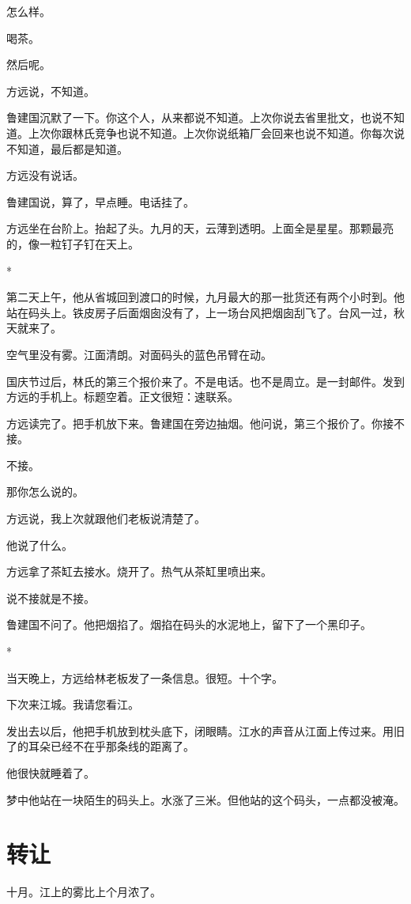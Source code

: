 \documentclass[UTF8,a5paper,11pt,openany]{ctexbook}
\newcommand{\scene}{\vspace{1em}\begin{center}*\quad*\quad*\end{center}\vspace{0.5em}}
\begin{document}
怎么样。

喝茶。

然后呢。

方远说，不知道。

鲁建国沉默了一下。你这个人，从来都说不知道。上次你说去省里批文，也说不知道。上次你跟林氏竞争也说不知道。上次你说纸箱厂会回来也说不知道。你每次说不知道，最后都是知道。

方远没有说话。

鲁建国说，算了，早点睡。电话挂了。

方远坐在台阶上。抬起了头。九月的天，云薄到透明。上面全是星星。那颗最亮的，像一粒钉子钉在天上。


\scene

第二天上午，他从省城回到渡口的时候，九月最大的那一批货还有两个小时到。他站在码头上。铁皮房子后面烟囱没有了，上一场台风把烟囱刮飞了。台风一过，秋天就来了。

空气里没有雾。江面清朗。对面码头的蓝色吊臂在动。

国庆节过后，林氏的第三个报价来了。不是电话。也不是周立。是一封邮件。发到方远的手机上。标题空着。正文很短：速联系。

方远读完了。把手机放下来。鲁建国在旁边抽烟。他问说，第三个报价了。你接不接。

不接。

那你怎么说的。

方远说，我上次就跟他们老板说清楚了。

他说了什么。

方远拿了茶缸去接水。烧开了。热气从茶缸里喷出来。

说不接就是不接。

鲁建国不问了。他把烟掐了。烟掐在码头的水泥地上，留下了一个黑印子。


\scene

当天晚上，方远给林老板发了一条信息。很短。十个字。

下次来江城。我请您看江。

发出去以后，他把手机放到枕头底下，闭眼睛。江水的声音从江面上传过来。用旧了的耳朵已经不在乎那条线的距离了。

他很快就睡着了。

梦中他站在一块陌生的码头上。水涨了三米。但他站的这个码头，一点都没被淹。

\clearpage

\chapter{转让}
\indent
十月。江上的雾比上个月浓了。
\end{document}
